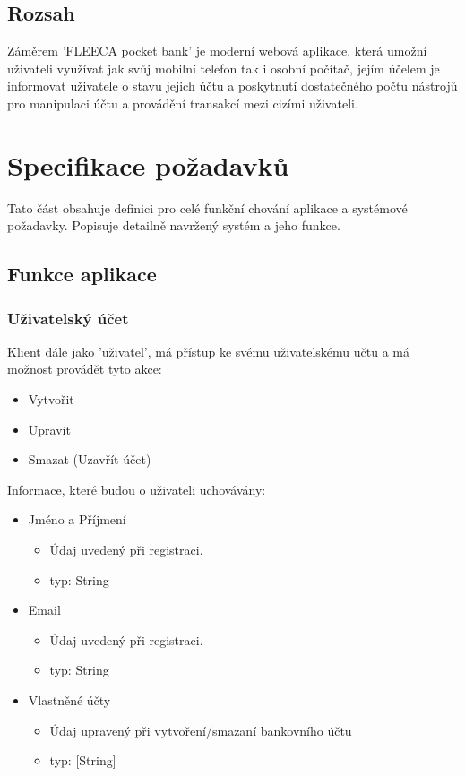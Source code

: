 \documentclass[FM,SP]{tulthesis}
\newcommand{\appName}{FLEECA pocket bank}
\newcommand{\appNameQ}{'\appName'}
\begin{document}
\section{Rozsah}
Záměrem \appNameQ{} je moderní webová aplikace, která umožní uživateli využívat jak svůj mobilní telefon tak i osobní počítač, jejím účelem je informovat uživatele o stavu jejich účtu a poskytnutí dostatečného počtu nástrojů pro manipulaci účtu a provádění transakcí mezi cizími uživateli.

\chapter{Specifikace požadavků}

Tato část obsahuje definici pro celé funkční chování aplikace a systémové požadavky. Popisuje detailně navržený systém a jeho funkce.

\section{Funkce aplikace}

\subsection{Uživatelský účet}

Klient dále jako 'uživatel', má přístup ke svému uživatelskému učtu a má možnost provádět tyto akce:
\begin{itemize}
    \item Vytvořit
    \item Upravit
    \item Smazat  (Uzavřít účet)
\end{itemize}
Informace, které budou o uživateli uchovávány:
\begin{itemize}
    \item Jméno a Příjmení
          \begin{itemize}
              \item Údaj uvedený při registraci.
              \item typ: String
          \end{itemize}
    \item Email
          \begin{itemize}
              \item Údaj uvedený při registraci.
              \item typ: String
          \end{itemize}
    \item Vlastněné účty
          \begin{itemize}
              \item Údaj upravený při vytvoření/smazaní bankovního účtu
              \item typ: [String]
          \end{itemize}
\end{itemize}
\end{document}
